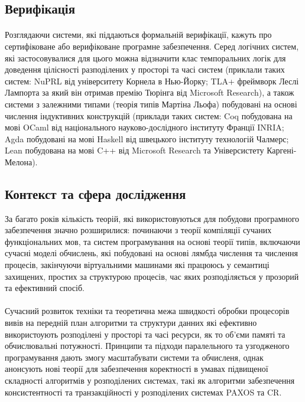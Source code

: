 \documentclass[11pt,oneside]{article}
\begin{document}
\newpage
\subsection{Верифікація}

   \paragraph{}
   Розглядаючи системи, які піддаються формальній верифікації, кажуть про
   сертифіковане або верифіковане програмне забезпечення. Серед логічних систем, які
   застосовувалися для цього можна відзначити клас темпоральних логік для доведення
   цілісності разподілених у просторі та часі систем (приклали таких систем: NuPRL від університету Корнела в Нью-Йорку;
   TLA+ фреймворк Леслі Лампорта за який він отримав премію Тюрінга від Microsoft Research), а також системи з залежними
   типами (теорія типів Мартіна Льофа) побудовані на основі числення індуктивних конструкцій (приклади таких систем:
   Coq побудована на мові OCaml від національного науково-дослідного інституту Франції INRIA;
   Agda побудовані на мові Haskell від швецького інституту технологій Чалмерс;
   Lean побудована на мові C++ від Microsoft Research та Універсистету Каргені-Мелона).


\subsection{Контекст та сфера дослідження}

\vspace{0.5cm}
   За багато років кількість теорій, які використовуються для побудови програмного забезпечення значно розширилися:
   починаючи з теорії компіляції сучаних функціональних мов, та систем програмування на основі теорії типів,
   включаючи сучасні моделі обчислень, які побудовані на основі лямбда числення та числення процесів, закінчуючи віртуальними
   машинами які працююсь у семантиці захищених, простих за структурою процесів, час яких розподіляється
   у прозорий та ефективний спосіб.

   \paragraph{}
   Сучасний розвиток техніки та теоретична межа швидкості обробки процесорів вивів на передній план алгоритми та структури
   данних які ефективно використоують розподілені у просторі та часі ресурси, як то об’єми памяті та обчислювальні потужності.
   Принципи та підходи паралельного та узгодженого програмування дають змогу масштабувати системи та обчисленя, однак
   анонсують нові теорії для забезпечення коректності в умавах підвищеної складності алгоритмів у розподілених системах,
   такі як алгоритми забезпечення консистентності та транзакційності у розподілених системах PAXOS та CR.
\end{document}
